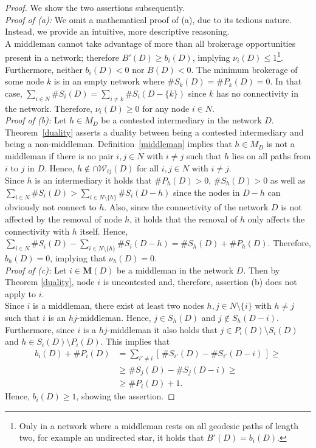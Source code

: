 \documentclass[11pt,fleqn]{article}
\begin{document}
\begin{proof}
We show the two assertions subsequently.
\\[1ex]
\emph{Proof of (a):}
We omit a mathematical proof of (a), due to its tedious nature. Instead, we provide an intuitive, more descriptive reasoning.
\\
A middleman cannot take advantage of more than all brokerage opportunities present in a network; therefore $B'(D) \geqslant b_{i}(D)$, implying $\nu_{i}(D) \leqslant 1$\footnote{Only in a network where a middleman rests on all geodesic paths of length two, for example an undirected star, it holds that $B'(D) = b_{i}(D)$.}.
\\
Furthermore, neither $b_{i}(D) < 0$ nor $B(D) < 0$. The minimum brokerage of some node $k$ is in an empty network where $\# S_{k}(D) = \# P_{k}(D) = 0$. In that case, $\sum_{i \in N} \# S_{i}(D) = \sum_{i \neq k} \# S_{i}(D - \{k\})$ since $k$ has no connectivity in the network. Therefore, $\nu_i (D) \geqslant 0$ for any node $i \in N$.
\\[1ex]
\emph{Proof of (b):}
Let $h \in M_D$ be a contested intermediary in the network $D$. Theorem~\ref{duality} asserts a duality between being a contested intermediary and being a non-middleman. Definition~\ref{middleman} implies that $h \in M_D$ is not a middleman if there is no pair $i,j \in N$ with $i \neq j$ such that $h$ lies on all paths from $i$ to $j$ in $D$. Hence, $h \notin \cap \mathcal{W}_{ij}(D)$ for all $i,j \in N$ with $i \neq j$.
\\
Since $h$ is an intermediary it holds that $\# P_{h}(D) > 0$, $\# S_{h}(D) > 0$ as well as $\sum_{i \in N} \# S_{i}(D) > \sum_{i \in N \setminus \{h\}} \# S_{i}(D - h)$ since the nodes in $D - h$ can obviously not connect to $h$. Also, since the connectivity of the network $D$ is not affected by the removal of node $h$, it holds that the removal of $h$ only affects the connectivity with $h$ itself. Hence, $\sum_{i \in N} \# S_{i}(D) - \sum_{i \in N \setminus \{ h \}} \# S_{i}(D - h) = \# S_{h}(D) + \# P_{h}(D)$. Therefore, $b_h (D) =0$, implying that $\nu_{h} (D) = 0$.
\\[1ex]
\emph{Proof of (c):}
Let $i \in \mathbf M (D)$ be a middleman in the network $D$. Then by Theorem \ref{duality}, node $i$ is uncontested and, therefore, assertion (b) does not apply to $i$.
\\
Since $i$ is a middleman, there exist at least two nodes $h,j \in N \setminus \{ i \}$ with $h \neq j$ such that $i$ is an $hj$-middleman. Hence, $j \in S_h (D)$ and $j \notin S_h (D-i)$. Furthermore, since $i$ is a $hj$-middleman it also holds that $j \in P_i (D) \setminus S_i (D)$ and $h \in S_i (D) \setminus P_i(D)$. This implies that
\begin{align*}
	b_i(D) + \#P_{i}(D) & =  \sum_{i' \neq i} \left[ \, \# S_{i'}(D) - \# S_{i'}(D - i) \, \right] \geqslant \\
	& \geqslant \# S_{j}(D) - \# S_{j}(D - i) \geqslant \\
	& \geqslant \#P_{i}(D) +1.
\end{align*}
Hence, $b_i(D) \geqslant 1$, showing the assertion.
\end{proof}
\end{document}
